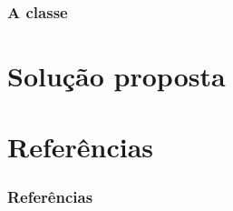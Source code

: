 \documentclass[aspectratio=169]{beamer}
\begin{document}
\begin{frame}
	\frametitle{A classe \msg}
\end{frame}

\section{Solução proposta}
\section{Referências}

\begin{frame}[allowframebreaks]
	\frametitle{Referências}
	
	
\end{frame}
\end{document}
